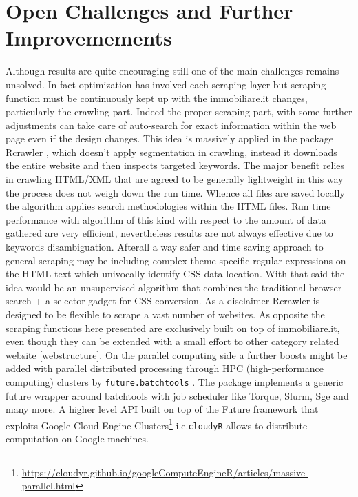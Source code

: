 \documentclass[
  12pt,
  a4paper,
  oneside]{book}
\newcommand{\passthrough}[1]{#1}
\DeclareRobustCommand{\href}[2]{#2\footnote{\url{#1}}}
\theoremstyle{definition}
\theoremstyle{definition}
\theoremstyle{definition}
\theoremstyle{remark}
\begin{document}
\hypertarget{challenges}{%
\section{Open Challenges and Further Improvemements}\label{challenges}}

Although results are quite encouraging still one of the main challenges remains unsolved. In fact optimization has involved each scraping layer but scraping function must be continuously kept up with the immobiliare.it changes, particularly the crawling part. Indeed the proper scraping part, with some further adjustments can take care of auto-search for exact information within the web page even if the design changes. This idea is massively applied in the package Rcrawler \citet{Rcrawler}, which doesn't apply segmentation in crawling, instead it downloads the entire website and then inspects targeted keywords. The major benefit relies in crawling HTML/XML that are agreed to be generally lightweight in this way the process does not weigh down the run time.
Whence all files are saved locally the algorithm applies search methodologies within the HTML files. Run time performance with algorithm of this kind with respect to the amount of data gathered are very efficient, nevertheless results are not always effective due to keywords disambiguation.
Afterall a way safer and time saving approach to general scraping may be including complex theme specific regular expressions on the HTML text which univocally identify CSS data location. With that said the idea would be an unsupervised algorithm that combines the traditional browser search + a selector gadget for CSS conversion.
As a disclaimer Rcrawler is designed to be flexible to scrape a vast number of websites. As opposite the scraping functions here presented are exclusively built on top of immobiliare.it, even though they can be extended with a small effort to other category related website \ref{webstructure}.
On the parallel computing side a further boosts might be added with parallel distributed processing through HPC (high-performance computing) clusters by \passthrough{\lstinline!future.batchtools!} \citet{futurebatchtools}. The package implements a generic future wrapper around batchtools with job scheduler like Torque, Slurm, Sge and many more. A higher level API built on top of the Future framework that exploits \href{https://cloudyr.github.io/googleComputeEngineR/articles/massive-parallel.html}{Google Cloud Engine Clusters} i.e.\passthrough{\lstinline!cloudyR!} allows to distribute computation on Google machines.
\end{document}
